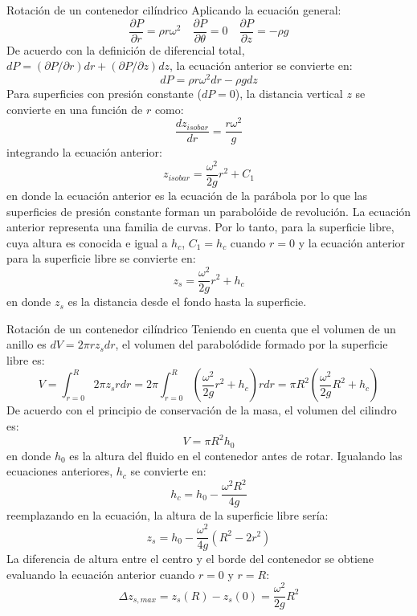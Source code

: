 \documentclass [xcolor=svgnames, t] {beamer}
\begin{document}
\begin{frame}{Rotaci\'on de un contenedor cil\'indrico}
\vspace{-0.4cm}
\footnotesize
Aplicando la ecuaci\'on general:
$$
\frac{\partial P}{\partial r} = \rho r \omega^2 \quad \frac{\partial P}{\partial \theta} = 0 \quad \frac{\partial P}{\partial z} = -\rho g
$$
De acuerdo con la definici\'on de diferencial total, $dP = (\partial P / \partial r)dr + (\partial P / \partial z)dz$, la ecuaci\'on anterior se convierte en:
$$
dP = \rho r \omega^2 dr - \rho g dz
$$
Para superficies con presi\'on constante ($dP = 0$), la distancia vertical $z$ se convierte en una funci\'on de $r$ como:
$$
\frac{d z_{isobar}}{dr} = \frac{r \omega^2}{g}
$$
integrando la ecuaci\'on anterior:
\vspace{-0.4cm}
$$
z_{isobar} = \frac{\omega^2}{2g} r^2 + C_1
$$
en donde la ecuaci\'on anterior es la ecuaci\'on de la par\'abola por lo que las superficies de presi\'on constante forman un parabol\'oide de revoluci\'on. La ecuaci\'on anterior representa una familia de curvas. Por lo tanto, para la superficie libre, cuya altura es conocida e igual a $h_c$, $C_1=h_c$ cuando $r=0$ y la ecuaci\'on anterior para la superficie libre se convierte en:
\vspace{-0.3cm}
$$
z_s = \frac{\omega^2}{2g} r^2 + h_c
$$
en donde $z_s$ es la distancia desde el fondo hasta la superficie. 
\end{frame}

\begin{frame}{Rotaci\'on de un contenedor cil\'indrico}
\vspace{-0.4cm}
\footnotesize
Teniendo en cuenta que el volumen de un anillo es $dV = 2\pi r z_s dr$, el volumen del parabol\'odide formado por la superficie libre es:
$$
V = \int_{r=0}^R 2\pi z_s r dr = 2\pi \int_{r=0}^R \left( \frac{\omega^2}{2g} r^2 + h_c \right) r dr = \pi R^2 \left( \frac{\omega^2}{2g} R^2 + h_c \right)
$$
De acuerdo con el principio de conservaci\'on de la masa, el volumen del cilindro es:
$$
V=\pi R^2 h_0
$$
en donde $h_0$ es la altura del fluido en el contenedor antes de rotar. Igualando las ecuaciones anteriores, $h_c$ se convierte en:
$$
h_c = h_0 - \frac{\omega^2 R^2}{4g}
$$
reemplazando en la ecuaci\'on, la altura de la superficie libre ser\'ia:
$$
z_s = h_0 - \frac{\omega^2}{4g} ( R^2 -2r^2 )
$$
La diferencia de altura entre el centro y el borde del contenedor se obtiene evaluando la ecuaci\'on anterior cuando $r=0$ y $r=R$:
$$
\Delta z_{s,max} = z_s (R)- z_s (0) = \frac{\omega^2}{2g} R^2
$$
\end{frame}
\end{document}
